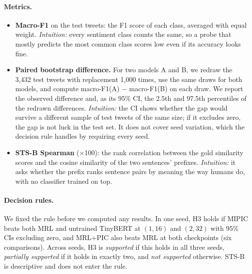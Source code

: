 \paragraph{Metrics.}
\begin{itemize}
  \item \textbf{Macro-F1} on the test tweets: the F1 score of each class, averaged with equal weight.
  \emph{Intuition:} every sentiment class counts the same, so a probe that mostly predicts the most common class scores low even if its accuracy looks fine.

  \item \textbf{Paired bootstrap difference.}
  For two models A and B, we redraw the 3,432 test tweets with replacement 1,000 times, use the same draws for both models, and compute macro-F1(A) $-$ macro-F1(B) on each draw.
  We report the observed difference and, as its 95\% CI, the 2.5th and 97.5th percentiles of the redrawn differences.
  \emph{Intuition:} the CI shows whether the gap would survive a different sample of test tweets of the same size; if it excludes zero, the gap is not luck in the test set.
  It does not cover seed variation, which the decision rule handles by requiring every seed.

  \item \textbf{STS-B Spearman} ($\times$100): the rank correlation between the gold similarity scores and the cosine similarity of the two sentences' prefixes.
  \emph{Intuition:} it asks whether the prefix ranks sentence pairs by meaning the way humans do, with no classifier trained on top.
\end{itemize}

\paragraph{Decision rules.}
We fixed the rule before we computed any results.
In one seed, H3 holds if MIPIC beats both MRL and untrained TinyBERT at $(1,16)$ and $(2,32)$ with 95\% CIs excluding zero, and MRL+PIC also beats MRL at both checkpoints (six comparisons).
Across seeds, H3 is \emph{supported} if this holds in all three seeds, \emph{partially supported} if it holds in exactly two, and \emph{not supported} otherwise.
STS-B is descriptive and does not enter the rule.

